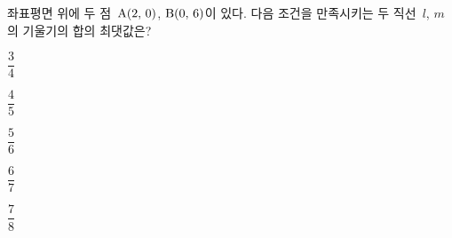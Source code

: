 좌표평면 위에 두 점~$\mathrm{A}(2,\,0)$, $\mathrm{B}(0,\,6)$이 있다. 다음 조건을 만족시키는 두 직선~$l$, $m$의 기울기의 합의 최댓값은?  
\begin{choices32}{\rule[-3ex]{0pt}{8ex}$\dfrac{3}{4}$}{\rule[-3ex]{0pt}{8ex}$\dfrac{4}{5}$}{\rule[-3ex]{0pt}{8ex}$\dfrac{5}{6}$}{\rule[-3ex]{0pt}{8ex}$\dfrac{6}{7}$}{\rule[-3ex]{0pt}{8ex}$\dfrac{7}{8}$}\end{choices32}
